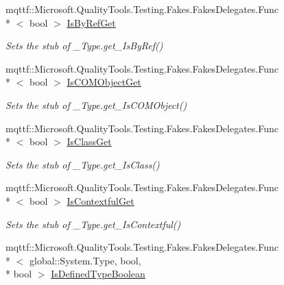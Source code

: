 \begin{DoxyCompactItemize}
mqttf\-::\-Microsoft.\-Quality\-Tools.\-Testing.\-Fakes.\-Fakes\-Delegates.\-Func\\*
$<$ bool $>$ \hyperlink{class_system_1_1_runtime_1_1_interop_services_1_1_fakes_1_1_stub___type_a7dac26ddea7067336e7ce6167f393c7c}{Is\-By\-Ref\-Get}
\begin{DoxyCompactList}\small\item\em Sets the stub of \-\_\-\-Type.\-get\-\_\-\-Is\-By\-Ref()\end{DoxyCompactList}\item 
mqttf\-::\-Microsoft.\-Quality\-Tools.\-Testing.\-Fakes.\-Fakes\-Delegates.\-Func\\*
$<$ bool $>$ \hyperlink{class_system_1_1_runtime_1_1_interop_services_1_1_fakes_1_1_stub___type_abe0a24b234453059c3bfb9f51132f8a5}{Is\-C\-O\-M\-Object\-Get}
\begin{DoxyCompactList}\small\item\em Sets the stub of \-\_\-\-Type.\-get\-\_\-\-Is\-C\-O\-M\-Object()\end{DoxyCompactList}\item 
mqttf\-::\-Microsoft.\-Quality\-Tools.\-Testing.\-Fakes.\-Fakes\-Delegates.\-Func\\*
$<$ bool $>$ \hyperlink{class_system_1_1_runtime_1_1_interop_services_1_1_fakes_1_1_stub___type_a0dc4bfb931a33744d1ce20825b4b3bef}{Is\-Class\-Get}
\begin{DoxyCompactList}\small\item\em Sets the stub of \-\_\-\-Type.\-get\-\_\-\-Is\-Class()\end{DoxyCompactList}\item 
mqttf\-::\-Microsoft.\-Quality\-Tools.\-Testing.\-Fakes.\-Fakes\-Delegates.\-Func\\*
$<$ bool $>$ \hyperlink{class_system_1_1_runtime_1_1_interop_services_1_1_fakes_1_1_stub___type_a9d04c0c6ee8a890f7c0e8d4c25ee04db}{Is\-Contextful\-Get}
\begin{DoxyCompactList}\small\item\em Sets the stub of \-\_\-\-Type.\-get\-\_\-\-Is\-Contextful()\end{DoxyCompactList}\item 
mqttf\-::\-Microsoft.\-Quality\-Tools.\-Testing.\-Fakes.\-Fakes\-Delegates.\-Func\\*
$<$ global\-::\-System.\-Type, bool, \\*
bool $>$ \hyperlink{class_system_1_1_runtime_1_1_interop_services_1_1_fakes_1_1_stub___type_aa7c4989b66dee597b933a1c45fe6df24}{Is\-Defined\-Type\-Boolean}

\end{DoxyCompactItemize}
